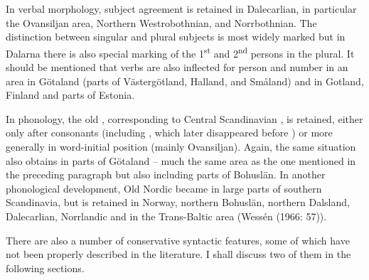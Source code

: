 
In verbal morphology, subject agreement is retained in Dalecarlian, in particular the Ovansiljan area, Northern Westrobothnian, and Norrbothnian. The distinction between singular and plural subjects is most widely marked but in Dalarna there is also special marking of the 1\textsuperscript{st} and 2\textsuperscript{nd} persons in the plural. It should be mentioned that verbs are also inflected for person and number in an area in Götaland (parts of Västergötland, Halland, and Småland) and in Gotland, Finland and parts of Estonia.


In phonology, the old , corresponding to Central Scandinavian , is retained, either only after consonants (including , which later disappeared before ) or more generally in word-initial position (mainly Ovansiljan). Again, the same situation also obtains in parts of Götaland – much the same area as the one mentioned in the preceding paragraph but also including parts of Bohuslän. In another phonological development, Old Nordic  became in large parts of southern Scandinavia, but is retained in Norway, northern Bohuslän, northern Dalsland, Dalecarlian, Norrlandic and in the Trans-Baltic area (Wessén (1966: 57)).


There are also a number of conservative syntactic features, some of which have not been properly described in the literature. I shall discuss two of them in the following sections.


